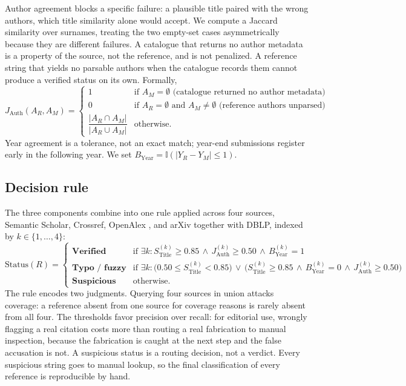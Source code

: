 \documentclass[11pt, a4paper]{article}
\begin{document}
Author agreement blocks a specific failure: a plausible title paired with the wrong authors, which title similarity alone would accept. We compute a Jaccard similarity over surnames, treating the two empty-set cases asymmetrically because they are different failures. A catalogue that returns no author metadata is a property of the source, not the reference, and is not penalized. A reference string that yields no parsable authors when the catalogue records them cannot produce a verified status on its own. Formally,
$$J_{\mathrm{Auth}}(A_R, A_M) = \begin{cases}
1 & \text{if } A_M = \emptyset \text{ (catalogue returned no author metadata)} \\
0 & \text{if } A_R = \emptyset \text{ and } A_M \neq \emptyset \text{ (reference authors unparsed)} \\
\dfrac{|A_R \cap A_M|}{|A_R \cup A_M|} & \text{otherwise.}
\end{cases}$$
Year agreement is a tolerance, not an exact match; year-end submissions register early in the following year. We set $B_{\mathrm{Year}} = \mathbb{I}(|Y_R - Y_M| \le 1)$.

\subsection{Decision rule}
The three components combine into one rule applied across four sources, Semantic Scholar, Crossref, OpenAlex \citep{priem2022}, and arXiv together with DBLP, indexed by $k \in \{1, \dots, 4\}$:
$$\mathrm{Status}(R) = \begin{cases}
{\textbf{Verified}} & \text{if } \exists k : S_{\mathrm{Title}}^{(k)} \ge 0.85 \,\land\, J_{\mathrm{Auth}}^{(k)} \ge 0.50 \,\land\, B_{\mathrm{Year}}^{(k)} = 1 \\[4pt]
{\textbf{Typo / fuzzy}} & \text{if } \exists k : \big(0.50 \le S_{\mathrm{Title}}^{(k)} < 0.85\big) \,\lor\, \big(S_{\mathrm{Title}}^{(k)} \ge 0.85 \,\land\, B_{\mathrm{Year}}^{(k)} = 0 \,\land\, J_{\mathrm{Auth}}^{(k)} \ge 0.50\big) \\[4pt]
{\textbf{Suspicious}} & \text{otherwise.}
\end{cases}$$
The rule encodes two judgments. Querying four sources in union attacks coverage: a reference absent from one source for coverage reasons is rarely absent from all four. The thresholds favor precision over recall: for editorial use, wrongly flagging a real citation costs more than routing a real fabrication to manual inspection, because the fabrication is caught at the next step and the false accusation is not. A suspicious status is a routing decision, not a verdict. Every suspicious string goes to manual lookup, so the final classification of every reference is reproducible by hand.
\end{document}
